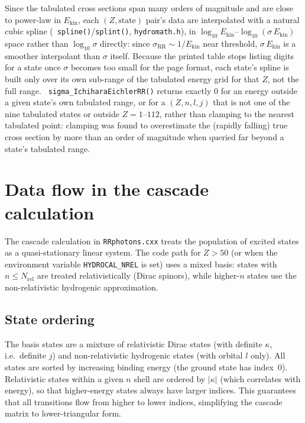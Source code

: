 \documentclass[11pt,a4paper]{article}
\begin{document}
Since the tabulated cross sections span many orders of magnitude and
are close to power-law in $E_{\mathrm{kin}}$, each $(Z,\text{state})$
pair's data are interpolated with a natural cubic spline ({\tt
spline()}/{\tt splint()}, {\tt hydromath.h}), in
$\log_{10}E_{\mathrm{kin}}$--$\log_{10}(\sigma\, E_{\mathrm{kin}})$
space rather than $\log_{10}\sigma$ directly: since
$\sigma_{\mathrm{RR}}\sim 1/E_{\mathrm{kin}}$ near threshold,
$\sigma\,E_{\mathrm{kin}}$ is a smoother interpolant than $\sigma$
itself. Because the printed table stops listing digits for a state
once $\sigma$ becomes too small for the page format, each state's
spline is built only over its own sub-range of the tabulated energy
grid for that $Z$, not the full range. {\tt
sigma\_IchiharaEichlerRR()} returns exactly $0$ for an energy outside
a given state's own tabulated range, or for a $(Z,n,l,j)$ that is not
one of the nine tabulated states or outside $Z=1$--$112$, rather than
clamping to the nearest tabulated point: clamping was found to
overestimate the (rapidly falling) true cross section by more than an
order of magnitude when queried far beyond a state's tabulated range.

\section{Data flow in the cascade calculation}

The cascade calculation in {\tt RRphotons.cxx} treats the population of
excited states as a quasi-stationary linear system.  The code path for
$Z > 50$ (or when the environment variable {\tt HYDROCAL\_NREL} is set)
uses a mixed basis: states with $n \le N_{\mathrm{rel}}$ are treated
relativistically (Dirac spinors), while higher-$n$ states use the
non-relativistic hydrogenic approximation.

\subsection{State ordering}

The basis states are a mixture of relativistic Dirac states (with
definite $\kappa$, i.e.\ definite $j$) and non-relativistic hydrogenic
states (with orbital $l$ only).  All states are sorted by increasing
binding energy (the ground state has index~0).  Relativistic states
within a given $n$ shell are ordered by $|\kappa|$ (which correlates
with energy), so that higher-energy states always have larger indices.
This guarantees that all transitions flow from higher to lower indices,
simplifying the cascade matrix to lower-triangular form.
\end{document}

